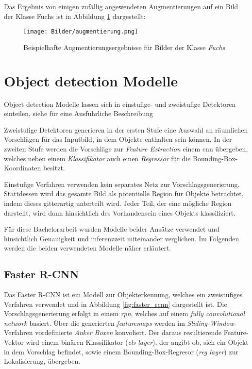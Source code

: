 Das Ergebnis von einigen zufällig angewendeten Augmentierungen 
auf ein Bild der Klasse Fuchs ist
in Abbildung \ref{fig:augmentierung} dargestellt:

\begin{figure}[H]
    \centering
    \texttt{[image: Bilder/augmentierung.png]}
    \caption{Beispielhafte Augmentierungsergebnisse 
    für Bilder der Klasse \textit{Fuchs}}
    \label{fig:augmentierung}
\end{figure}


\section{Object detection Modelle}

Object detection Modelle lassen sich
in einstufige- und zweistufige Detektoren einteilen,
siehe \cite{wuRecentAdvancesDeep2019} für eine 
Ausführliche Beschreibung

Zweistufige Detektoren generieren in der 
ersten Stufe eine Auswahl an räumlichen Vorschlägen
für das Inputbild, in dem Objekte enthalten sein 
können. 
In der zweiten Stufe werden die Vorschläge zur \textit{Feature 
Extraction} einem \Gls{cnn} übergeben, welches neben 
einem \textit{Klassifikator} auch einen \textit{Regressor} für 
die Bounding-Box-Koordinaten besitzt.

Einstufige Verfahren verwenden kein separates 
Netz zur Vorschlagsgenerierung. Stattdessen 
wird das gesamte Bild als potentielle
Region für Objekte betrachtet, indem 
dieses gitterartig unterteilt wird.
Jeder Teil, der eine mögliche Region darstellt, 
wird dann hinsichtlich des Vorhandensein 
eines Objekts klassifiziert.

Für diese Bachelorarbeit wurden 
Modelle beider Ansätze verwendet und 
hinsichtlich Genauigkeit und 
\Gls{inferenz}zeit miteinander verglichen.
Im Folgenden werden die beiden 
verwendeten Modelle näher erläutert.


\subsection*{Faster R-CNN}

Das Faster R-CNN \cite{renFasterRCNNRealTime2016a} 
ist ein Modell zur Objekterkennung, welches
ein zweistufiges Verfahren verwendet und 
in Abbildung \ref{fig:faster_rcnn} 
dargestellt ist.
Die Vorschlagsgenerierung erfolgt in einem 
\textit{\Gls{rpn}}, welches auf 
einem \textit{fully convolutional network} 
basiert.
Über die generierten \textit{\Glspl{featuremap}} werden im 
\textit{Sliding-Window}-Verfahren vordefinierte
\textit{Anker Boxen} konvoliert.
Der daraus resultierende Feature-Vektor wird 
einem binären Klassifikator (\textit{cls layer}), 
der angibt ob, sich ein Objekt
in dem Vorschlag befindet, 
sowie einem Bounding-Box-Regresor
(\textit{reg layer}) zur Lokalisierung,
übergeben.

